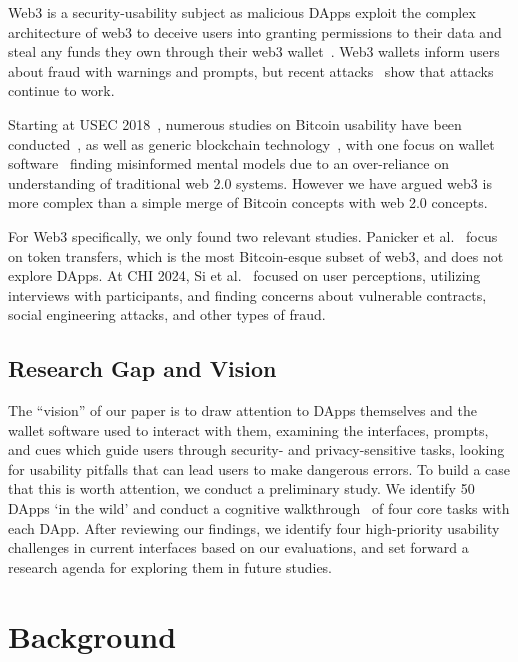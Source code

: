 \documentclass[conference]{IEEEtran}
\begin{document}
Web3 is a security-usability subject as malicious DApps exploit the complex architecture of web3 to deceive users into granting permissions to their data and steal any funds they own through their web3 wallet~\cite{si2024understanding,torres2023your}.
Web3 wallets inform users about fraud with warnings and prompts, but recent attacks~\cite{toulas2024lottiefiles,vismaya2024pepe,zmudzinski2024Eigenlayer} show that attacks continue to work.

Starting at USEC 2018~\cite{eskandari2018first}, numerous studies on Bitcoin usability have been conducted~\cite{gao2016of,krombholz2017the,mai2020user,sas2017design}, as well as generic blockchain technology~\cite{frohlich2022blockchain,jang2022userExperience,jang2020userPerspectives}, with one focus on wallet software~\cite{voskobojnikov2021u} finding misinformed mental models due to an over-reliance on understanding of traditional web 2.0 systems. However we have argued web3 is more complex than a simple merge of Bitcoin concepts with web 2.0 concepts.

For Web3 specifically, we only found two relevant studies. Panicker et al.~\cite{panicker2024end} focus on token transfers, which is the most Bitcoin-esque subset of web3, and does not explore DApps. At CHI 2024, Si et al.~\cite{si2024understanding} focused on user perceptions, utilizing interviews with participants, and finding concerns about vulnerable contracts, social engineering attacks, and other types of fraud.

\subsection{Research Gap and Vision}

The ``vision'' of our paper is to draw attention to DApps themselves and the wallet software used to interact with them, examining the interfaces, prompts, and cues which guide users through security- and privacy-sensitive tasks, looking for usability pitfalls that can lead users to make dangerous errors. To build a case that this is worth attention, we conduct a preliminary study. We identify 50 DApps `in the wild' and conduct a cognitive walkthrough~\cite{wharton1994cognitive} of four core tasks with each DApp. After reviewing our findings, we identify four high-priority usability challenges in current interfaces based on our evaluations, and set forward a research agenda for exploring them in future studies. 

\section{Background}
\end{document}
